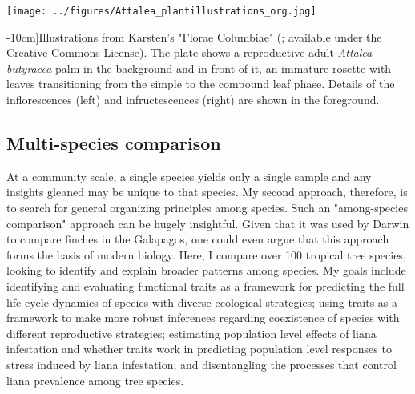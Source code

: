 \documentclass[b5paper,justified]{tufte-book} %
\begin{document}
\begin{fullwidth}
\begin{figure*}
\texttt{[image: ../figures/Attalea\_plantillustrations\_org.jpg]}
\caption[Illustrations from Karsten's "Florae Columbiae"][-10cm]{Illustrations from Karsten's "Florae Columbiae" (\citealt{Karsten1858};  available under the  Creative Commons License). The plate shows a reproductive adult \textit{Attalea butyracea} palm in the background and in front of it, an immature rosette with leaves transitioning from the simple to the compound leaf phase.  Details of the inflorescences (left) and infructescences (right) are shown in the foreground. 
 }
\label{fig:attaleaplate}
\end{figure*}

 
\subsection{Multi-species comparison} 
At a community scale, a single species yields only a single sample and any insights gleaned may be unique to that species. My second approach, therefore, is to search for general organizing principles among species. Such an "among-species comparison" approach can be hugely insightful. Given that it was used by Darwin to compare finches in the Galapagos, one could even argue that this approach forms the basis of modern biology. Here, I compare over 100 tropical tree species, looking to identify and explain broader patterns among species. My goals include identifying and evaluating functional traits as a framework for predicting the full life-cycle dynamics of species with diverse ecological strategies;  using traits as a framework to make more robust inferences regarding coexistence of species with different reproductive strategies; estimating population level effects of liana infestation and whether traits work in predicting population level responses to stress induced by liana infestation; and disentangling the processes that control liana prevalence among tree species.


\end{fullwidth}
\end{document}
